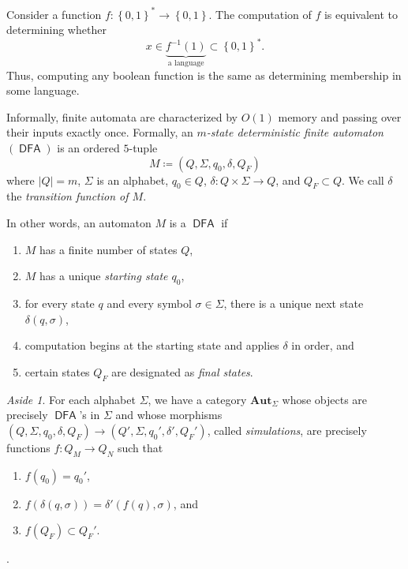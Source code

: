 \documentclass[10pt,letterpaper,cm]{nupset}
\theoremstyle{definition}
\theoremstyle{theorem}
\theoremstyle{remark}
\newtheorem*{aside}{Aside}
\newcommand{\1}{\mathbf{1}}
\newcommand{\0}{\vec 0}
\DeclareMathOperator{\DFA}{\mathsf{DFA}}
\begin{document}
\smallskip

Consider a function $f: \left\{0,1\right\}^{\ast} \to \left\{0,1\right\}$. The computation of $f$ is equivalent to determining whether $$x\in \underbrace{f^{-1}(1)}_{\text{a language}} \subset \left\{0,1\right\}^{\ast}.$$ Thus, computing any boolean function is the same as determining membership in some language.

\bigskip

Informally, finite automata are characterized by $O(1)$ memory and passing over their inputs exactly once.
Formally, an \textit{$m$-state deterministic finite automaton $(\DFA)$}  is an ordered $5$-tuple 
\[ \label{eqn:auto}
M\coloneqq \left(Q, \Sigma, q_0, \delta, Q_F\right)  \tag{$\alpha$}
\] where  $\left\lvert{Q}\right\rvert = m$, $\Sigma$ is an alphabet, $q_0\in Q$, $\delta : Q\times \Sigma \to Q$, and $Q_F\subset Q$. We call $\delta$ the \textit{transition function of $M$}.

In other words, an automaton $M$ is a $\DFA$ if
\begin{enumerate}[label=(\alph*)]
\item $M$ has a finite number of states $Q$,
\item $M$ has a unique \textit{starting state $q_0$},
\item for every state $q$ and every symbol $\sigma \in \Sigma$, there is a unique next state $\delta(q, \sigma)$,
\item computation begins at the starting state and applies $\delta$ in order, and
\item certain states $Q_F$ are designated as \textit{final states}.
\end{enumerate}

\begin{aside}
For each alphabet $\Sigma$, we have a category $\mathbf{Aut}_{\Sigma}$ whose objects are precisely $\DFA$'s in $\Sigma$ and  whose morphisms $ \left(Q, \Sigma, q_0, \delta, Q_F\right)  \to  \left(Q', \Sigma, q_0', \delta', Q_F'\right) $, called \textit{simulations}, are precisely functions $f: Q_M \to Q_N$ such that
\begin{enumerate}[label=(\roman*)]
\item $f(q_0) = q_0'$,
\item $f(\delta(q, \sigma)) = \delta'(f(q), \sigma)$, and
\item $f(Q_F) \subset Q_F'$.
\end{enumerate}.
\end{aside}

\medskip
\end{document}
